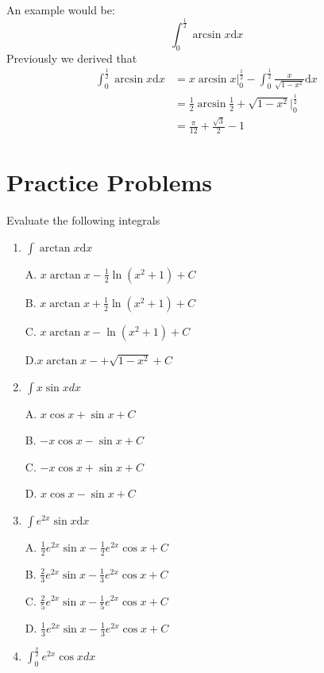 \documentclass{article}
\numberwithin{equation}{section}
\begin{document}
An example would be:
\[
\int_{0}^{\frac{1}{2}} \arcsin x \mathrm{d}x
\]
Previously we derived that
\begin{align*}
    \int_{0}^{\frac{1}{2}} \arcsin x \mathrm{d}x &= x\arcsin x \Big|_0^{\frac{1}{2}}- \int_{0}^{\frac{1}{2}} \frac{x}{\sqrt{1-x^2}} \mathrm{d}x\\
    &= \frac{1}{2} \arcsin \frac{1}{2} + \sqrt{1-x^2} \Big|_{0}^{\frac{1}{2}}\\
    &= \frac{\pi}{12} + \frac{\sqrt{3}}{2} - 1
\end{align*}

\newpage
\section{Practice Problems}
Evaluate the following integrals
\begin{enumerate}
    \item $\displaystyle\int \arctan{x} \mathrm{d}x$
    
    A. $\displaystyle x\arctan{x} -\frac{1}{2}\ln{(x^2 + 1)} + C$

    B. $\displaystyle x\arctan x + \frac{1}{2}\ln (x^2+1)+C$

    C. $\displaystyle x\arctan{x} - \ln(x^2+1)+C$

    D.$\displaystyle x\arctan{x} -+ \sqrt{1-x^2} +C$

    \item $\displaystyle \int x\sin x dx$
    
    A. $x\cos x + \sin x +C$

    B. $-x\cos x - \sin x +C$

    C. $-x\cos x + \sin x +C$

    D. $x\cos x -\sin x +C$

    \item $\displaystyle \int e^{2x} \sin x \mathrm{d}x$
    
    A. $\displaystyle \frac{1}{2} e^{2x} \sin x - \frac{1}{2}e^{2x} \cos x + C$

    B. $\displaystyle \frac{2}{3}e^{2x}\sin x - \frac{1}{3} e^{2x} \cos x + C$

    C. $\displaystyle \frac{2}{5} e^{2x} \sin x - \frac{1}{5} e^{2x} \cos x + C$

    D. $\displaystyle \frac{1}{3} e^{2x} \sin x - \frac{1}{3} e^{2x} \cos x +C$

    \item $\displaystyle \int_{0}^{\frac{\pi}{2}} e^{2x}\cos x dx$
    

\end{enumerate}
\end{document}
